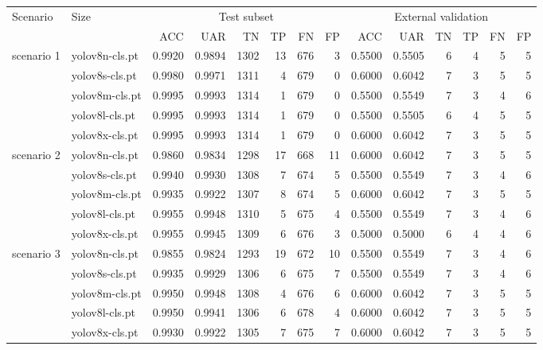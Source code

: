 \begin{table*}
    \centering
    \begin{tabular}{llrrrrrrrrrrrr}
        \toprule
         \multirow{2}{*}{Scenario} & \multirow{2}{*}{Size} & \multicolumn{6}{c}{Test subset} & \multicolumn{6}{c}{External validation} \\
         & & ACC & UAR & TN & TP & FN & FP & ACC & UAR & TN & TP & FN & FP \\
        \midrule
            \multirow{5}{*}{scenario 1} & yolov8n-cls.pt & 0.9920 & 0.9894 & 1302 & 13 & 676 & 3 & 0.5500 & 0.5505 & 6 & 4 & 5 & 5 \\
			 & yolov8s-cls.pt & 0.9980 & 0.9971 & 1311 & 4 & 679 & 0 & 0.6000 & 0.6042 & 7 & 3 & 5 & 5 \\
			 & yolov8m-cls.pt & 0.9995 & 0.9993 & 1314 & 1 & 679 & 0 & 0.5500 & 0.5549 & 7 & 3 & 4 & 6 \\
			 & yolov8l-cls.pt & 0.9995 & 0.9993 & 1314 & 1 & 679 & 0 & 0.5500 & 0.5505 & 6 & 4 & 5 & 5 \\
			 & yolov8x-cls.pt & 0.9995 & 0.9993 & 1314 & 1 & 679 & 0 & 0.6000 & 0.6042 & 7 & 3 & 5 & 5 \\
			\midrule
			\multirow{5}{*}{scenario 2} & yolov8n-cls.pt & 0.9860 & 0.9834 & 1298 & 17 & 668 & 11 & 0.6000 & 0.6042 & 7 & 3 & 5 & 5 \\
			 & yolov8s-cls.pt & 0.9940 & 0.9930 & 1308 & 7 & 674 & 5 & 0.5500 & 0.5549 & 7 & 3 & 4 & 6 \\
			 & yolov8m-cls.pt & 0.9935 & 0.9922 & 1307 & 8 & 674 & 5 & 0.6000 & 0.6042 & 7 & 3 & 5 & 5 \\
			 & yolov8l-cls.pt & 0.9955 & 0.9948 & 1310 & 5 & 675 & 4 & 0.5500 & 0.5549 & 7 & 3 & 4 & 6 \\
			 & yolov8x-cls.pt & 0.9955 & 0.9945 & 1309 & 6 & 676 & 3 & 0.5000 & 0.5000 & 6 & 4 & 4 & 6 \\
			\midrule
			\multirow{5}{*}{scenario 3} & yolov8n-cls.pt & 0.9855 & 0.9824 & 1293 & 19 & 672 & 10 & 0.5500 & 0.5549 & 7 & 3 & 4 & 6 \\
			 & yolov8s-cls.pt & 0.9935 & 0.9929 & 1306 & 6 & 675 & 7 & 0.5500 & 0.5549 & 7 & 3 & 4 & 6 \\
			 & yolov8m-cls.pt & 0.9950 & 0.9948 & 1308 & 4 & 676 & 6 & 0.6000 & 0.6042 & 7 & 3 & 5 & 5 \\
			 & yolov8l-cls.pt & 0.9950 & 0.9941 & 1306 & 6 & 678 & 4 & 0.6000 & 0.6042 & 7 & 3 & 5 & 5 \\
			 & yolov8x-cls.pt & 0.9930 & 0.9922 & 1305 & 7 & 675 & 7 & 0.6000 & 0.6042 & 7 & 3 & 5 & 5 \\

\end{tabular}
\end{table*}
